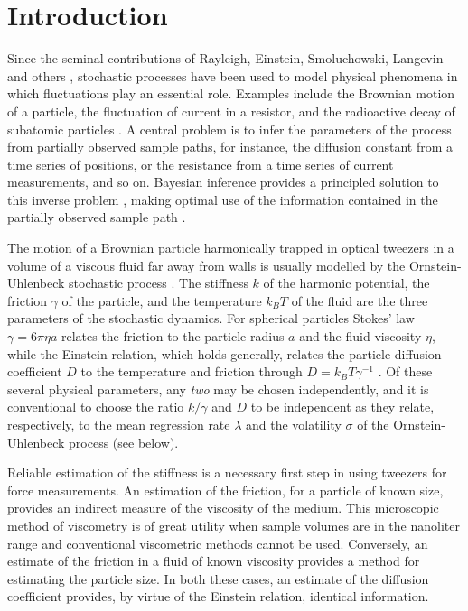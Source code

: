 \documentclass[english,aps, onecolumn, prl,superscriptaddress, notitlepage]{revtex4-1}
\begin{document}
\section{Introduction}

Since the seminal contributions of Rayleigh, Einstein, Smoluchowski,
Langevin and others \cite{chandrasekhar1943stochastic}, stochastic
processes have been used to model physical phenomena in which fluctuations
play an essential role. Examples include the Brownian motion of a
particle, the fluctuation of current in a resistor, and the radioactive
decay of subatomic particles \cite{van1992stochastic}. A central
problem is to infer the parameters of the process from partially observed
sample paths, for instance, the diffusion constant from a time series
of positions, or the resistance from a time series of current measurements,
and so on. Bayesian inference provides a principled solution to this
inverse problem \cite{jeffreys1998theory}, making optimal use of
the information contained in the partially observed sample path \cite{zellner1988optimal}. 

The motion of a Brownian particle harmonically trapped in optical
tweezers in a volume of a viscous fluid far away from walls is usually
modelled by the Ornstein-Uhlenbeck stochastic process \cite{van1992stochastic,gardiner1985handbook}.
The stiffness $k$ of the harmonic potential, the friction $\gamma$
of the particle, and the temperature $k_{B}T$ of the fluid are the
three parameters of the stochastic dynamics. For spherical particles
Stokes' law $\gamma=6\pi\eta a$ relates the friction to the particle
radius $a$ and the fluid viscosity $\eta$, while the Einstein relation,
which holds generally, relates the particle diffusion coefficient
$D$ to the temperature and friction through $D=k_{B}T\gamma^{-1}$
\cite{kubo1966fluctuation}. Of these several physical parameters,
any \emph{two} may be chosen independently, and it is conventional
to choose the ratio $k/\gamma$ and $D$ to be independent as they
relate, respectively, to the mean regression rate $\lambda$ and the
volatility $\sigma$ of the Ornstein-Uhlenbeck process (see below). 

Reliable estimation of the stiffness is a necessary first step in
using tweezers for force measurements. An estimation of the friction,
for a particle of known size, provides an indirect measure of the
viscosity of the medium. This microscopic method of viscometry is
of great utility when sample volumes are in the nanoliter range and
conventional viscometric methods cannot be used. Conversely, an estimate
of the friction in a fluid of known viscosity provides a method for
estimating the particle size. In both these cases, an estimate of
the diffusion coefficient provides, by virtue of the Einstein relation,
identical information.
\end{document}
